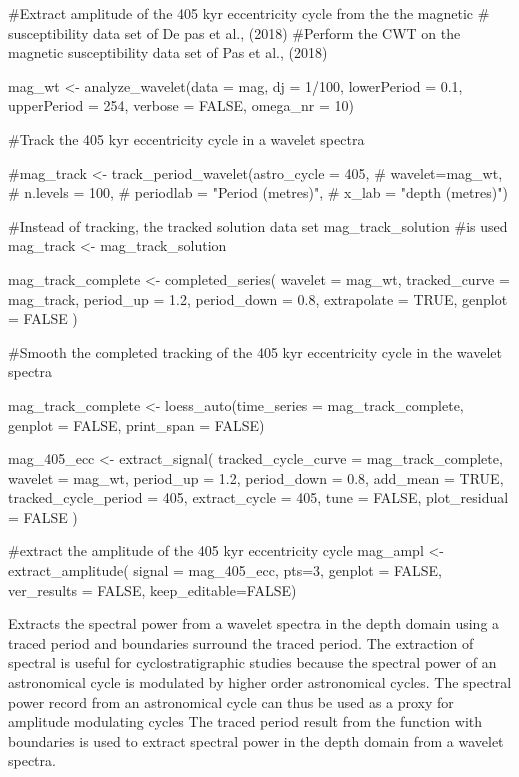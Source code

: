 \documentclass[a4paper]{book}
\begin{document}
\begin{Examples}
\begin{ExampleCode}

#Extract amplitude of the 405 kyr eccentricity cycle from the the magnetic
# susceptibility data set of De pas et al., (2018)
#Perform the CWT on the magnetic susceptibility data set of Pas et al., (2018)

mag_wt <- analyze_wavelet(data = mag,
dj = 1/100,
lowerPeriod = 0.1,
upperPeriod = 254,
verbose = FALSE,
omega_nr = 10)

#Track the 405 kyr eccentricity cycle in a wavelet spectra

#mag_track <- track_period_wavelet(astro_cycle = 405,
#                                   wavelet=mag_wt,
#                                   n.levels = 100,
#                                   periodlab = "Period (metres)",
#                                   x_lab = "depth (metres)")

#Instead of tracking, the tracked solution data set mag_track_solution
#is used
mag_track <- mag_track_solution

mag_track_complete <- completed_series(
  wavelet = mag_wt,
  tracked_curve = mag_track,
  period_up = 1.2,
  period_down = 0.8,
  extrapolate = TRUE,
  genplot = FALSE
)

#Smooth the completed tracking of the 405 kyr eccentricity cycle in the wavelet spectra

mag_track_complete <- loess_auto(time_series = mag_track_complete,
genplot = FALSE, print_span = FALSE)




mag_405_ecc  <- extract_signal(
tracked_cycle_curve = mag_track_complete,
wavelet = mag_wt,
period_up = 1.2,
period_down = 0.8,
add_mean = TRUE,
tracked_cycle_period = 405,
extract_cycle = 405,
tune = FALSE,
plot_residual = FALSE
)

#extract the amplitude  of the 405 kyr eccentricity cycle
mag_ampl <- extract_amplitude(
signal = mag_405_ecc,
pts=3,
genplot = FALSE,
ver_results = FALSE,
keep_editable=FALSE)


\end{ExampleCode}
\end{Examples}
%
\begin{Description}
Extracts the  spectral power from a wavelet spectra in the depth domain using a traced period
and boundaries surround the traced period.
The extraction of spectral is useful for cyclostratigraphic studies because the spectral power of an
astronomical cycle is modulated by higher order astronomical cycles.
The spectral power record from an astronomical cycle can thus be used as a proxy for
amplitude modulating cycles
The traced period result from the 
function with boundaries is used to extract spectral power in the depth domain from a wavelet spectra.
\end{Description}
\end{document}
